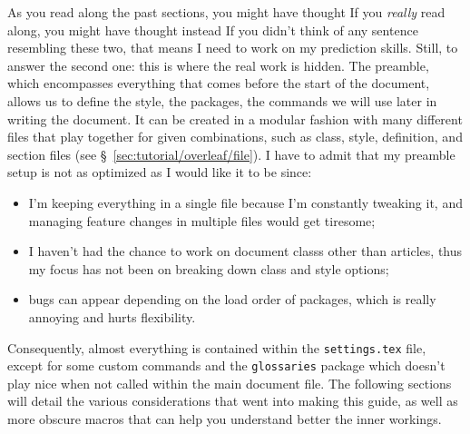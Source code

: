As you read along the past sections, you might have thought  If you \textit{really} read along, you might have thought instead  If you didn't think of any sentence resembling these two, that means I need to work on my prediction skills. Still, to answer the second one: this is where the real work is hidden. The preamble, which encompasses everything that comes before the start of the document, allows us to define the style, the \glspl{package}, the \glspl{command} we will use later in writing the document. It can be created in a modular fashion with many different files that play together for given combinations, such as \gls{class}, style, \gls{definition}, and section files (see \S~\ref{sec:tutorial/overleaf/file}). I have to admit that my preamble setup is not as optimized as I would like it to be since:
\begin{itemize}
    \item I'm keeping everything in a single file because I'm constantly tweaking it, and managing feature changes in multiple files would get tiresome;
    \item I haven't had the chance to work on document \glspl{class} other than articles, thus my focus has not been on breaking down \gls{class} and style options;
    \item bugs can appear depending on the load order of \glspl{package}, which is really annoying and hurts flexibility.
\end{itemize}

Consequently, almost everything is contained within the \texttt{settings.tex} file, except for some custom \glspl{command} and the \texttt{glossaries} \gls{package} which doesn't play nice when not called within the main document file. The following sections will detail the various considerations that went into making this guide, as well as more obscure \glspl{macro} that can help you understand better the inner workings.